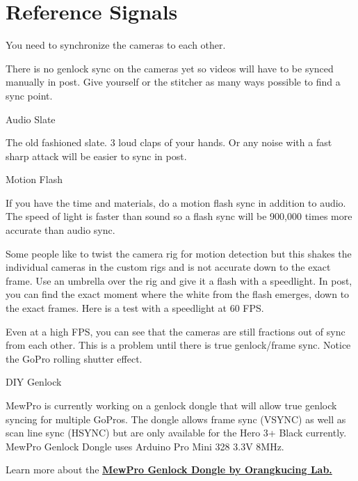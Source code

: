 \chapter{Reference Signals}
\pagecolor{white}
\label{chap:22}
\begin{fullwidth}


\problem

{\large You need to synchronize the cameras to each other. \par}

There is no genlock sync on the cameras yet so videos will have to be synced manually in post. Give yourself or the stitcher as many ways possible to find a sync point. 

\solution

{\large Audio Slate \par}

The old fashioned slate. 3 loud claps of your hands. Or any noise with a fast sharp attack will be easier to sync in post. 

{\large Motion Flash \par}

If you have the time and materials, do a motion flash sync in addition to audio. The speed of light is faster than sound so a flash sync will be 900,000 times more accurate than audio sync. 

Some people like to twist the camera rig for motion detection but this shakes the individual cameras in the custom rigs and is not accurate down to the exact frame. 
Use an umbrella over the rig and give it a flash with a speedlight. In post, you can find the exact moment where the white from the flash emerges, down to the exact frames. 
\clearpage
Here is a test with a speedlight at 60 FPS. 


Even at a high FPS, you can see that the cameras are still fractions out of sync from each other. This is a problem until there is true genlock/frame sync. Notice the GoPro rolling shutter effect. 

{\large DIY Genlock \par}

MewPro is currently working on a genlock dongle that will allow true genlock syncing for multiple GoPros. The dongle allows frame sync (VSYNC) as well as scan line sync (HSYNC) but are only available for the Hero 3+ Black currently. MewPro Genlock Dongle uses Arduino Pro Mini 328 3.3V 8MHz.

Learn more about the \textbf{\href{http://mewpro.cc/2015/03/20/how-to-use-mewpro-genlock-dongle/}{MewPro Genlock Dongle by Orangkucing Lab.}}


\clearpage
\end{fullwidth}
